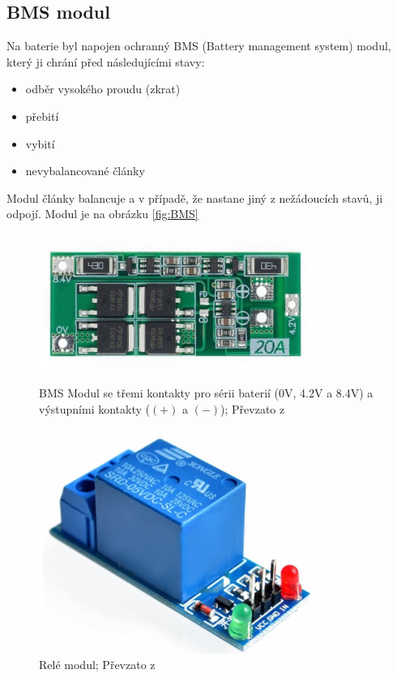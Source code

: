 \subsection{BMS modul}
Na baterie byl napojen ochranný BMS (Battery management system) modul, který ji chrání před následujícími stavy:
\begin{itemize}
  \item odběr vysokého proudu (zkrat)
  \item přebití
  \item vybití
  \item nevybalancované články
\end{itemize}
Modul články balancuje a v případě, že nastane jiný z nežádoucích stavů, ji odpojí. Modul je na obrázku \ref{fig:BMS}


\begin{figure}[htb]
  \centering
  \begin{minipage}{0.45\textwidth}
    \centering
  \includegraphics[width=0.8\textwidth]{img/BMS.jpg}
  \caption{\label{fig:BMS} BMS Modul se třemi kontakty pro sérii baterií (0V, 4.2V a 8.4V) a výstupními kontakty ($(+)$ a $(-)$); Převzato z~\cite{laskakit-BMS}}
  \end{minipage}\hfill
  \begin{minipage}{0.45\textwidth}
    \centering
  \includegraphics[width=0.8\textwidth]{img/relay.jpg}
  \caption{\label{fig:relay} Relé modul; Převzato z~\cite{laskakit-relay}}
  \end{minipage}
\end{figure}

